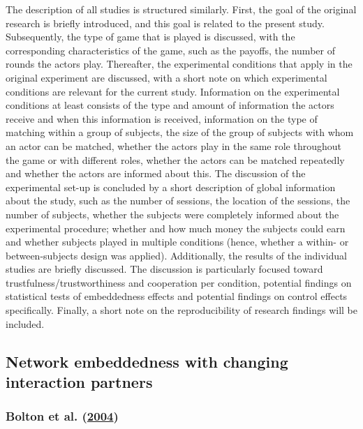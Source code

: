\documentclass[
  11pt,
]{article}
\begin{document}
The description of all studies is structured similarly.
First, the goal of the original research is briefly introduced, and this goal is related to the present study.
Subsequently, the type of game that is played is discussed, with the corresponding characteristics of the game, such as the payoffs, the number of rounds the actors play.
Thereafter, the experimental conditions that apply in the original experiment are discussed, with a short note on which experimental conditions are relevant for the current study.
Information on the experimental conditions at least consists of the type and amount of information the actors receive and when this information is received, information on the type of matching within a group of subjects, the size of the group of subjects with whom an actor can be matched, whether the actors play in the same role throughout the game or with different roles, whether the actors can be matched repeatedly and whether the actors are informed about this.
The discussion of the experimental set-up is concluded by a short description of global information about the study, such as the number of sessions, the location of the sessions, the number of subjects, whether the subjects were completely informed about the experimental procedure; whether and how much money the subjects could earn and whether subjects played in multiple conditions (hence, whether a within- or between-subjects design was applied).
Additionally, the results of the individual studies are briefly discussed.
The discussion is particularly focused toward trustfulness/trustworthiness and cooperation per condition, potential findings on statistical tests of embeddedness effects and potential findings on control effects specifically.
Finally, a short note on the reproducibility of research findings will be included.

\hypertarget{network-embeddedness-with-changing-interaction-partners}{%
\subsection{Network embeddedness with changing interaction partners}\label{network-embeddedness-with-changing-interaction-partners}}

\hypertarget{bolton_electronic_2004}{%
\subsubsection{\texorpdfstring{Bolton et al. (\protect\hyperlink{ref-bolton_electronic_2004}{2004})}{Bolton et al. (2004)}}\label{bolton_electronic_2004}}
\end{document}
